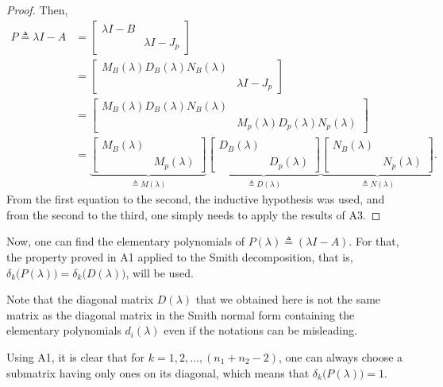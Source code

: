 \documentclass[11pt]{article}
\begin{document}
\begin{proof}
Then, 
\begin{align*}
P \triangleq \lambda I - A &= \begin{bmatrix}
\lambda I - B & \\
& \lambda I - J_p 
\end{bmatrix}\\
&= \begin{bmatrix}
M_{B}(\lambda) D_{B}(\lambda) N_{B}(\lambda) & \\
& \lambda I - J_p
\end{bmatrix}\\
&= \begin{bmatrix}
M_{B}(\lambda) D_{B}(\lambda) N_{B}(\lambda) & \\
& M_{p}(\lambda) D_{p}(\lambda) N_{p}(\lambda)
\end{bmatrix}\\
&= \underbrace{\begin{bmatrix}
M_{B}(\lambda) & \\
& M_{p}(\lambda)
\end{bmatrix}}_{\triangleq M(\lambda)}\underbrace{\begin{bmatrix}
D_{B}(\lambda) & \\
& D_{p}(\lambda)
\end{bmatrix}}_{\triangleq D(\lambda)}\underbrace{\begin{bmatrix}
N_{B}(\lambda) & \\
& N_{p}(\lambda)
\end{bmatrix}}_{\triangleq N(\lambda)}.
\end{align*}
From the first equation to the second, the inductive hypothesis was used, and from the second to the third, one simply needs to apply the results of A3.
\end{proof}

Now, one can find the elementary polynomials of $P(\lambda) \triangleq (\lambda I - A)$. For that, the property proved in A1 applied to the Smith decomposition, that is, $\delta_k\big(P(\lambda)\big) = \delta_k\big(D(\lambda)\big)$, will be used.

Note that the diagonal matrix $D(\lambda)$ that we obtained here is not the same matrix as the diagonal matrix in the Smith normal form containing the elementary polynomials $d_i(\lambda)$ even if the notations can be misleading.

Using A1, it is clear that for $k = 1, 2, \dots, (n_1 + n_2 - 2)$, one can always choose a submatrix having only ones on its diagonal, which means that $\delta_k\big(P(\lambda)\big) = 1$. 
\end{document}
